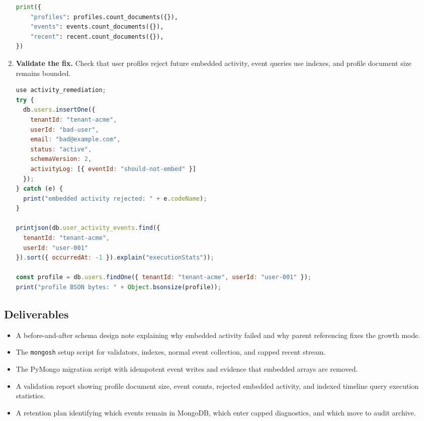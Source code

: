 \begin{enumerate}
\begin{lstlisting}[language=Python, caption={PyMongo migration from embedded activity arrays to parent-referenced events.}]
print({
    "profiles": profiles.count_documents({}),
    "events": events.count_documents({}),
    "recent": recent.count_documents({}),
})
\end{lstlisting}

    \item \textbf{Validate the fix.} Check that user profiles reject future embedded activity, event queries use indexes, and profile document size remains bounded.

\begin{lstlisting}[language=JavaScript, caption={\texttt{mongosh} validation checks for the remediated activity-log design.}]
use activity_remediation;
try {
  db.users.insertOne({
    tenantId: "tenant-acme",
    userId: "bad-user",
    email: "bad@example.com",
    status: "active",
    schemaVersion: 2,
    activityLog: [{ eventId: "should-not-embed" }]
  });
} catch (e) {
  print("embedded activity rejected: " + e.codeName);
}

printjson(db.user_activity_events.find({
  tenantId: "tenant-acme",
  userId: "user-001"
}).sort({ occurredAt: -1 }).explain("executionStats"));

const profile = db.users.findOne({ tenantId: "tenant-acme", userId: "user-001" });
print("profile BSON bytes: " + Object.bsonsize(profile));
\end{lstlisting}
\end{enumerate}

\subsection*{Deliverables}
\begin{itemize}
    \item A before-and-after schema design note explaining why embedded activity failed and why parent referencing fixes the growth mode.
    \item The \texttt{mongosh} setup script for validators, indexes, normal event collection, and capped recent stream.
    \item The PyMongo migration script with idempotent event writes and evidence that embedded arrays are removed.
    \item A validation report showing profile document size, event counts, rejected embedded activity, and indexed timeline query execution statistics.
    \item A retention plan identifying which events remain in MongoDB, which enter capped diagnostics, and which move to audit archive.
\end{itemize}

